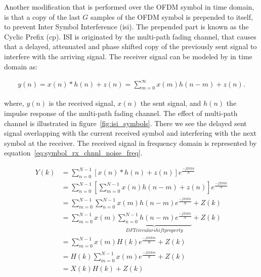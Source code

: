 Another modification that is performed over the OFDM symbol in time domain, is that a copy of the last $G$ samples of the OFDM symbol is prepended to itself, to prevent Inter Symbol Interference (\ac{isi}). The prepended part is known as the Cyclic Prefix (\ac{cp}). ISI is originated by the multi-path fading channel, that causes that a delayed, attenuated and phase shifted copy of the previously sent signal to interfere with the arriving signal. The receiver signal can be modeled by in time domain as:





\begin{eqnarray}
y(n) = {x(n)*h(n)} + z(n) = \sum_{m=0}^{\infty}{x(m)h(n-m)} + z(n).
\label{eq:symbol_ofdm_channel}
\end{eqnarray}

\noindent where, $y(n)$ is the received signal, $x(n)$ the sent signal, and $h(n)$ the impulse response of the multi-path fading channel. The effect of multi-path channel is illustrated in figure~\ref{fig:isi_symbols}. There we see the delayed sent signal overlapping with the current received symbol and interfering with the next symbol at the receiver. The received signal in frequency domain is represented by equation~\ref{eq:symbol_rx_chnnl_noise_freq}.  

\begin{align}
Y(k) & = \sum\limits_{n= 0}^{N-1} [ {x(n)*h(n)} + z(n) ] e^{\frac{-j2{\pi}kn}{N}} \\ 
& = \sum\limits_{n= 0}^{N-1} [ \sum_{m=0}^{N-1}{x(n)h(n-m)} + z(n) ] e^{\frac{-j2{\pi}kn}{N}} \nonumber \\ 
&  = \sum\limits_{m= 0}^{N-1} \sum_{n=0}^{N-1}{x(m)h(n-m)} e^{\frac{-j2{\pi}kn}{N}} + Z(k) \nonumber \\
&  = \sum\limits_{m= 0}^{N-1} x(m) \underbrace{\sum_{n=0}^{N-1}{h(n-m)} e^{\frac{-j2{\pi}kn}{N}}}_{DFT circular shift property} + Z(k) \label{eq:circ_conv_dft_circ_shift} \\
&  = \sum\limits_{m= 0}^{N-1} {x(m)H(k)}e^{\frac{-j2{\pi}km}{N}} + Z(k) \nonumber \\
&  = H(k) \sum\limits_{m= 0}^{N-1} {x(m)}e^{\frac{-j2{\pi}km}{N}} + Z(k) \nonumber \\
&  = X(k)H(k) + Z(k) 
\label{eq:symbol_rx_chnnl_noise_freq}
\end{align}


